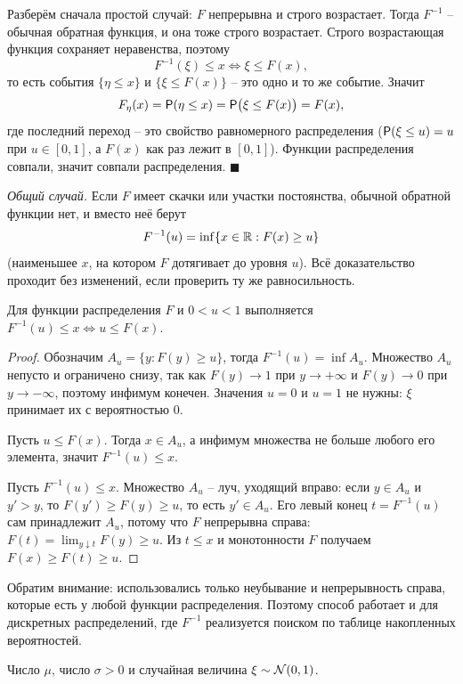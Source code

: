 \documentclass[12pt,a4paper]{article}
\begin{document}
\resh Разберём сначала простой случай: $F$ непрерывна и строго возрастает. Тогда
$F^{-1}$ -- обычная обратная функция, и она тоже строго возрастает. Строго
возрастающая функция сохраняет неравенства, поэтому
\[
  F^{-1}(\xi) \le x \iff \xi \le F(x),
\]
то есть события $\{\eta \le x\}$ и $\{\xi \le F(x)\}$ -- это одно и то же
событие. Значит
\[
  F_\eta(x) = \mathsf{P}(\eta \le x) = \mathsf{P}\bigl(\xi \le F(x)\bigr) = F(x),
\]
где последний переход -- это свойство равномерного распределения
($\mathsf{P}(\xi \le u) = u$ при $u \in [0,1]$, а $F(x)$ как раз лежит в $[0,1]$).
Функции распределения совпали, значит совпали распределения. $\blacksquare$

\smallskip
\emph{Общий случай.} Если $F$ имеет скачки или участки постоянства, обычной
обратной функции нет, и вместо неё берут
\[
  F^{-1}(u) = \inf\{x \in \mathbb{R} : F(x) \ge u\}
\]
(наименьшее $x$, на котором $F$ дотягивает до уровня $u$). Всё доказательство
проходит без изменений, если проверить ту же равносильность.

\begin{lemma}
Для функции распределения $F$ и $0 < u < 1$ выполняется
$F^{-1}(u) \le x \iff u \le F(x)$.
\end{lemma}
\begin{proof}
Обозначим $A_u = \{y : F(y) \ge u\}$, тогда $F^{-1}(u) = \inf A_u$. Множество
$A_u$ непусто и ограничено снизу, так как $F(y) \to 1$ при $y \to +\infty$ и
$F(y) \to 0$ при $y \to -\infty$, поэтому инфимум конечен. Значения $u = 0$ и
$u = 1$ не нужны: $\xi$ принимает их с вероятностью 0.

Пусть $u \le F(x)$. Тогда $x \in A_u$, а инфимум множества не больше любого его
элемента, значит $F^{-1}(u) \le x$.

Пусть $F^{-1}(u) \le x$. Множество $A_u$ -- луч, уходящий вправо: если
$y \in A_u$ и $y' > y$, то $F(y') \ge F(y) \ge u$, то есть $y' \in A_u$. Его
левый конец $t = F^{-1}(u)$ сам принадлежит $A_u$, потому что $F$ непрерывна
справа: $F(t) = \lim_{y \downarrow t}F(y) \ge u$. Из $t \le x$ и монотонности
$F$ получаем $F(x) \ge F(t) \ge u$.
\end{proof}

Обратим внимание: использовались только неубывание и непрерывность справа,
которые есть у любой функции распределения. Поэтому способ работает и для
дискретных распределений, где $F^{-1}$ реализуется поиском по таблице
накопленных вероятностей.

\dano Число $\mu$, число $\sigma > 0$ и случайная величина $\xi \sim \mathcal{N}(0,1)$.
\end{document}
